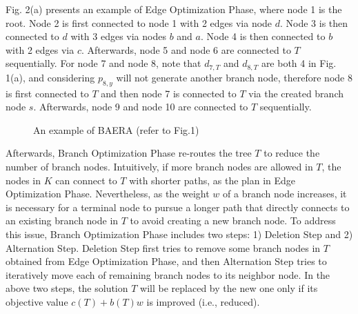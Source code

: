 \documentclass[conference]{IEEEtran}
\begin{document}
Fig. 2(a) presents an example of Edge Optimization Phase, where node 1 is
the root. Node 2 is first connected to node 1 with 2 edges via node $d $. Node 3 is then connected to $d$ with 3 edges via nodes $b$ and $a$. Node 4 is then connected to $b$ with 2 edges via $c$. Afterwards,
node 5 and node 6 are connected to $T$ sequentially. For node 7
and node 8, note that $d_{7,T}$ and $d_{8,T}$ are both 4 in Fig. 1(a), and considering $p_{8,y}$ will not generate another branch node, therefore node 8
is first connected to $T$ and then node 7 is connected to $T$ via the created branch node $s$.
Afterwards, node 9 and node 10 are connected to $T$ sequentially.

\begin{figure}[t]
\centering
{}
\smallskip
{}
\caption{An example of BAERA (refer to Fig.1)}
\label{fig2:subfig}
\end{figure}

Afterwards, Branch Optimization Phase re-routes the tree $T$ to reduce the
number of branch nodes. Intuitively, if more branch nodes are allowed in $T$, the nodes in $K$ can connect to $T$ with shorter paths, as
the plan in Edge Optimization Phase. Nevertheless, as the weight $w$ of a
branch node increases, it is necessary for a terminal node to pursue a
longer path that directly connects to an existing branch node in $T$ to
avoid creating a new branch node. To address this issue, Branch Optimization
Phase includes two steps: 1) Deletion Step and 2) Alternation Step. Deletion
Step first tries to remove some branch nodes in $T$ obtained from Edge
Optimization Phase, and then Alternation Step tries to iteratively move each of remaining branch nodes to its neighbor node. In the above two steps, the
solution $T$ will be replaced by the new one only if its objective value $c(T)+b(T)w$ is improved (i.e., reduced).
\end{document}

